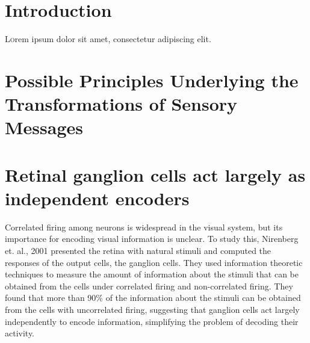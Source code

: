 \documentclass[twoside]{article}
\begin{document}
\begin{multicols}{2} %

\section{Introduction}

\lettrine[nindent=0em,lines=3]{L} orem ipsum dolor sit amet, consectetur adipiscing elit.
\lipsum[2-3] 





\section{Possible Principles Underlying the Transformations of Sensory Messages}







\section{Retinal ganglion cells act largely as independent encoders}

\footnotesize
Correlated firing among neurons is widespread in the visual system, but its importance for encoding visual information is unclear. To study this, Nirenberg et. al., 2001 presented the retina with natural stimuli and computed the responses of the output cells, the ganglion cells. They used information theoretic techniques to measure the amount of information about the stimuli that can be obtained from the cells under correlated firing and non-correlated firing. They found that more than 90\% of the information about the stimuli can be obtained from the cells with uncorrelated firing, suggesting that ganglion cells act largely independently to encode information, simplifying the problem of decoding their activity. 


\end{multicols}
\end{document}
